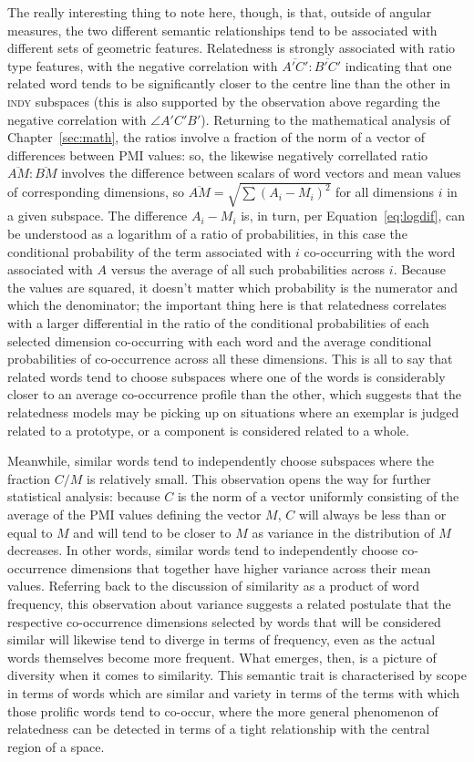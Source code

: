 The really interesting thing to note here, though, is that, outside of angular measures, the two different semantic relationships tend to be associated with different sets of geometric features.  Relatedness is strongly associated with ratio type features, with the negative correlation with $\overline{A'C'}:\overline{B'C'}$ indicating that one related word tends to be significantly closer to the centre line than the other in \textsc{indy} subspaces (this is also supported by the observation above regarding the negative correlation with $\angle A'C'B'$).  Returning to the mathematical analysis of Chapter~\ref{sec:math}, the ratios involve a fraction of the norm of a vector of differences between PMI values: so, the likewise negatively correllated ratio $\overline{AM}:\overline{BM}$ involves the difference between scalars of word vectors and mean values of corresponding dimensions, so $\overline{AM} = \sqrt{\sum(A_{i}-M_{i})^2}$ for all dimensions $i$ in a given subspace.  The difference $A_{i}-M_{i}$ is, in turn, per Equation~\ref{eq:logdif}, can be understood as a logarithm of a ratio of probabilities, in this case the conditional probability of the term associated with $i$ co-occurring with the word associated with $A$ versus the average of all such probabilities across $i$.  Because the values are squared, it doesn't matter which probability is the numerator and which the denominator; the important thing here is that relatedness correlates with a larger differential in the ratio of the conditional probabilities of each selected dimension co-occurring with each word and the average conditional probabilities of co-occurrence across all these dimensions.  This is all to say that related words tend to choose subspaces where one of the words is considerably closer to an average co-occurrence profile than the other, which suggests that the relatedness models may be picking up on situations where an exemplar is judged related to a prototype, or a component is considered related to a whole.

Meanwhile, similar words tend to independently choose subspaces where the fraction $C/M$ is relatively small.  This observation opens the way for further statistical analysis: because $C$ is the norm of a vector uniformly consisting of the average of the PMI values defining the vector $M$, $C$ will always be less than or equal to $M$ and will tend to be closer to $M$ as variance in the distribution of $M$ decreases.  In other words, similar words tend to independently choose co-occurrence dimensions that together have higher variance across their mean values.  Referring back to the discussion of similarity as a product of word frequency, this observation about variance suggests a related postulate that the respective co-occurrence dimensions selected by words that will be considered similar will likewise tend to diverge in terms of frequency, even as the actual words themselves become more frequent.  What emerges, then, is a picture of diversity when it comes to similarity.  This semantic trait is characterised by scope in terms of words which are similar and variety in terms of the terms with which those prolific words tend to co-occur, where the more general phenomenon of relatedness can be detected in terms of a tight relationship with the central region of a space.

